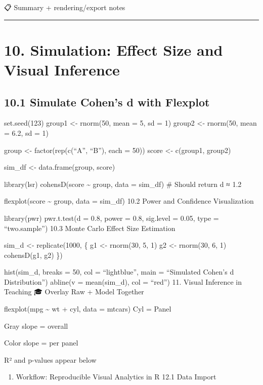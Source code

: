 \documentclass[
  letterpaper,
  DIV=11,
  numbers=noendperiod]{scrreprt}
\providecommand{\tightlist}{%
  \setlength{\itemsep}{0pt}\setlength{\parskip}{0pt}}
\begin{document}
{📋 Summary + rendering/export notes

\begin{center}\rule{0.5\linewidth}{0.5pt}\end{center}

\section{10. Simulation: Effect Size and Visual
Inference}\label{simulation-effect-size-and-visual-inference}

\subsection{10.1 Simulate Cohen's d with
Flexplot}\label{simulate-cohens-d-with-flexplot}

set.seed(123) group1 \textless- rnorm(50, mean = 5, sd = 1) group2
\textless- rnorm(50, mean = 6.2, sd = 1)

group \textless- factor(rep(c(``A'', ``B''), each = 50)) score
\textless- c(group1, group2)

sim\_df \textless- data.frame(group, score)

library(lsr) cohensD(score \textasciitilde{} group, data = sim\_df) \#
Should return d ≈ 1.2

flexplot(score \textasciitilde{} group, data = sim\_df) 10.2 Power and
Confidence Visualization

library(pwr) pwr.t.test(d = 0.8, power = 0.8, sig.level = 0.05, type =
``two.sample'') 10.3 Monte Carlo Effect Size Estimation

sim\_d \textless- replicate(1000, \{ g1 \textless- rnorm(30, 5, 1) g2
\textless- rnorm(30, 6, 1) cohensD(g1, g2) \})

hist(sim\_d, breaks = 50, col = ``lightblue'', main = ``Simulated
Cohen's d Distribution'') abline(v = mean(sim\_d), col = ``red'') 11.
Visual Inference in Teaching 🎓 Overlay Raw + Model Together

flexplot(mpg \textasciitilde{} wt + cyl, data = mtcars) Cyl = Panel

Gray slope = overall

Color slope = per panel

R² and p-values appear below

\begin{enumerate}
\def\labelenumi{\arabic{enumi}.}
\setcounter{enumi}{11}
\tightlist
\item
  Workflow: Reproducible Visual Analytics in R 12.1 Data Import
\end{enumerate}

}
\end{document}
